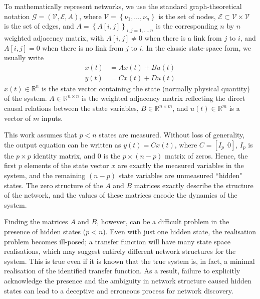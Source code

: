 \documentclass[twocolumn,12pt]{autart}
\theoremstyle{plain}
\begin{document}
To mathematically represent networks, we use the standard graph-theoretical notation $\mathcal{G}=\left(\mathcal{V},\mathcal{E},A\right)$, where $\mathcal{V}=\left\{\nu_{1},\ldots,\nu_{n}\right\}$ is the set of nodes, $\mathcal{E}\subset\mathcal{V}\times\mathcal{V}$ is the set of edges, and $A=\left\{A[i,j]\right\}_{i,j=1,\ldots,n}$ is the corresponding $n$ by $n$ weighted adjacency matrix, with $A[i,j]\neq0$ when there is a link from $j$ to $i$, and $A[i,j]=0$ when there is no link from $j$ to $i$. 
In the classic state-space form, we usually write
\begin{align}
\dot{x}(t)&={A}{x}(t)+{B}{u}(t) \nonumber\\
y(t)&=Cx(t)+Du(t) \label{eq:ss}
\end{align}
$x(t)\in\mathbb{R}^n$ is the state vector containing the state (normally physical quantity) of the system. ${A}\in\mathbb{R}^{n\times n}$ is the weighted adjacency matrix reflecting the direct causal relations between the state variables, ${B}\in\mathbb{R}^{n\times m}$, and ${u}(t)\in\mathbb{R}^m$ is a vector of $m$ inputs.  

This work assumes that $p<n$ states are measured. Without loss of generality, the output equation can be written as ${y}(t) = {C}{x}(t)$, where ${C}=[I_p \ \ 0]$, ${I_p}$ is the $p\times p$ identity matrix, and ${0}$ is the $p \times (n-p)$ matrix of zeros.  Hence, the first $p$ elements of the state vector $x$ are exactly the measured variables in the system, and the remaining $(n-p)$ state variables are unmeasured ``hidden" states. The zero structure of the ${A}$ and ${B}$ matrices exactly describe the structure of the network, and the values of these matrices encode the dynamics of the system.


Finding the matrices $A$ and $B$, however, can be a difficult problem in the presence of hidden states ($p<n$). Even with just one hidden state, the realisation problem becomes ill-posed; a transfer function will have many state space realisations, which may suggest entirely different network structures for the system.  This is true even if it is known that the true system is, in fact, a minimal realisation of the identified transfer function.  As a result, failure to explicitly acknowledge the presence and the ambiguity in network structure caused hidden states can lead to a deceptive and erroneous process for network discovery.
\end{document}
